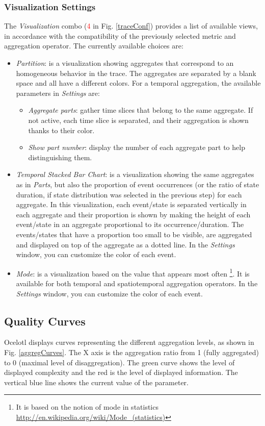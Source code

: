\documentclass[twoside]{article}
\begin{document}
\begin{sloppypar}
\subsubsection{Visualization Settings}
\label{visuop}
The \textit{Visualization} combo (\textcolor{red}{4} in Fig. \ref{traceConf}) provides a list of available views, in accordance with the compatibility of the previously selected metric and aggregation operator. The currently available choices are:
\begin{itemize}
	\item \textit{Partition}: is a visualization showing aggregates that correspond to an homogeneous behavior in the trace. The aggregates are separated by a blank space and all have a different colors. For a temporal aggregation, the available parameters in \textit{Settings} are:
	\begin{itemize}
		\item \textit{Aggregate parts}: gather time slices that belong to the same aggregate. If not active, each time slice is separated, and their aggregation is shown thanks to their color.
		\item \textit{Show part number}: display the number of each aggregate part to help distinguishing them.
	\end{itemize}
	\item \textit{Temporal Stacked Bar Chart}: is a visualization showing the same aggregates as in \textit{Parts}, but also the proportion of event occurrences (or the ratio of state duration, if state distribution was selected in the previous step) for each aggregate. In this visualization, each event/state is separated vertically in each aggregate and their proportion is shown by making the height of each event/state in an aggregate proportional to its occurrence/duration. The events/states that have a proportion too small to be visible, are aggregated and displayed on top of the aggregate as a dotted line. In the \textit{Settings} window, you can customize the color of each event.
	\item \textit{Mode}: is a visualization based on the value that appears most often \footnote{It is based on the notion of mode in statistics \url{http://en.wikipedia.org/wiki/Mode_(statistics)}}. It is available for both temporal and spatiotemporal aggregation operators. In the \textit{Settings} window, you can customize the color of each event.
\end{itemize}

\subsection{Quality Curves}
Ocelotl displays curves representing the different aggregation levels, as shown in Fig. \ref{aggregCurves}. The X axis is the aggregation ratio from 1 (fully aggregated) to 0 (maximal level of disaggregation). %
The green curve shows the level of displayed complexity and the red is the level of displayed information. 
The vertical blue line shows the current value of the parameter.


\end{sloppypar}
\end{document}
